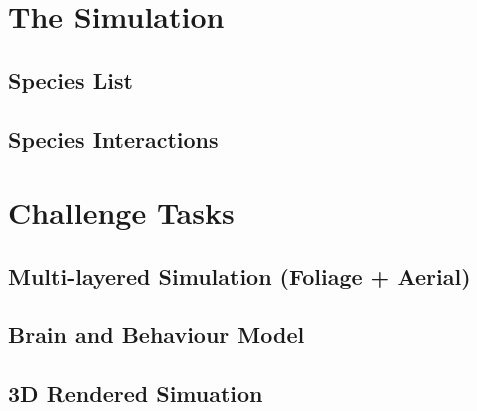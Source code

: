 \documentclass{article}
\begin{document}
    \begin{multicols}{2}
        \section{The Simulation}

        \subsection{Species List}

        \subsection{Species Interactions}
        
        \section{Challenge Tasks}

        \subsection{Multi-layered Simulation (Foliage + Aerial)}

        \subsection{Brain and Behaviour Model}

        \subsection{3D Rendered Simuation}


    \end{multicols}

    \newpage
\end{document}

